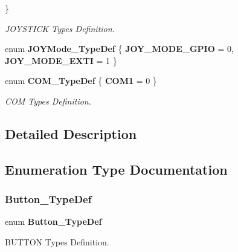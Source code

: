 \begin{DoxyCompactItemize}
 \}
\begin{DoxyCompactList}\small\item\em J\+O\+Y\+S\+T\+I\+CK Types Definition. \end{DoxyCompactList}\item 
enum \textbf{ J\+O\+Y\+Mode\+\_\+\+Type\+Def} \{ \textbf{ J\+O\+Y\+\_\+\+M\+O\+D\+E\+\_\+\+G\+P\+IO} = 0, 
\textbf{ J\+O\+Y\+\_\+\+M\+O\+D\+E\+\_\+\+E\+X\+TI} = 1
 \}
\item 
enum \textbf{ C\+O\+M\+\_\+\+Type\+Def} \{ \textbf{ C\+O\+M1} = 0
 \}
\begin{DoxyCompactList}\small\item\em C\+OM Types Definition. \end{DoxyCompactList}\end{DoxyCompactItemize}


\subsection{Detailed Description}


\subsection{Enumeration Type Documentation}
\mbox{\label{group___exported___types_ga643816dfbad5c734fc25a29ce8d35bb1}} 
\subsubsection{Button\+\_\+\+Type\+Def}
{\footnotesize\ttfamily enum \textbf{ Button\+\_\+\+Type\+Def}}



B\+U\+T\+T\+ON Types Definition. 

